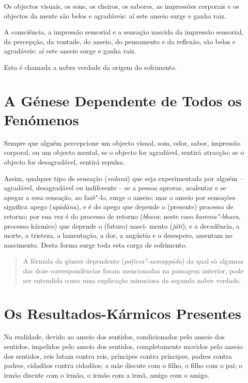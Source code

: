 Os objectos visuais, os sons, os cheiros, os sabores, as impressões corporais e
os objectos da mente são belos e agradáveis: aí este anseio surge e ganha raiz.

A consciência, a impressão sensorial e a sensação nascida da impressão
sensorial, da percepção, da vontade, do anseio, do pensamento e da reflexão, são
belas e agradáveis: aí este anseio surge e ganha raiz.

\enlargethispage{\baselineskip}

Esta é chamada a nobre verdade da origem do sofrimento.


\section{A Génese Dependente de Todos os Fenómenos}

Sempre que alguém percepcione um objecto visual, som, odor, sabor, impressão
corporal, ou um objecto mental, se o objecto for agradável, sentirá atracção; se
o objecto for desagradável, sentirá repulsa.

Assim, qualquer tipo de sensação (\emph{vedanā}) que seja experimentada por
alguém -- agradável, desagradável ou indiferente -- se a pessoa aprovar,
acalentar e se apegar a essa sensação, ao fazê"-lo, surge o anseio; mas o anseio
por sensações significa apego (\emph{upādāna}), e é do apego que depende o
(presente) processo de retorno; por sua vez é do processo de retorno
(\emph{bhava}; neste caso \emph{kamma"-bhava}, processo kármico) que depende o
(futuro) nasci- mento (\emph{jāti}); e a decadência, a morte, a tristeza, a
lamentação, a dor, a angústia e o desespero, assentam no nascimento. Desta forma
surge toda esta carga de sofrimento.


\begin{quote}
  A fórmula da génese dependente (\emph{pa\d{t}icca"-samuppāda}) da qual só algumas das
  doze correspondências foram mencionadas na passagem anterior, pode ser
  entendida como uma explicação minuciosa da segunda nobre verdade.
\end{quote}

\section{Os Resultados-Kármicos Presentes}

Na realidade, devido ao anseio dos sentidos, condicionados pelo anseio dos
sentidos, impelidos pelo anseio dos sentidos, completamente movidos pelo anseio
dos sentidos, reis lutam contra reis, príncipes contra príncipes, padres contra
padres, cidadãos contra cidadãos; a mãe discute com o filho, o filho com o pai;
o irmão discute com o irmão, o irmão com a irmã, amigo com o amigo.

